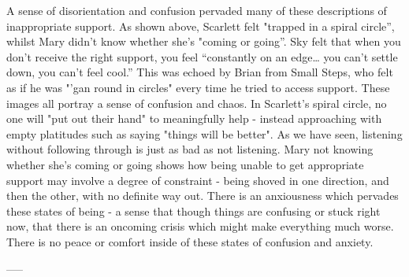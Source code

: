 A sense of disorientation and confusion pervaded many of these descriptions of inappropriate support. As shown above, Scarlett felt "trapped in a spiral circle”, whilst Mary didn’t know whether she's "coming or going”. Sky felt that when you don’t receive the right support, you feel “constantly on an edge… you can’t settle down, you can’t feel cool.” This was echoed by Brian from Small Steps, who felt as if he was "'gan round in circles" every time he tried to access support. These images all portray a sense of confusion and chaos. In Scarlett's spiral circle, no one will "put out their hand" to meaningfully help - instead approaching with empty platitudes such as saying "things will be better". As we have seen, listening without following through is just as bad as not listening. Mary not knowing whether she's coming or going shows how being unable to get appropriate support may involve a degree of constraint - being shoved in one direction, and then the other, with no definite way out. There is an anxiousness which pervades these states of being - a sense that though things are confusing or stuck right now, that there is an oncoming crisis which might make everything much worse. There is no peace or comfort inside of these states of confusion and anxiety. 

-----
